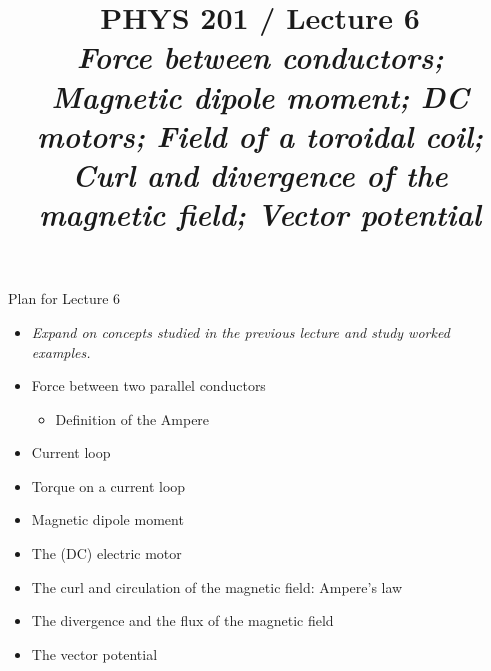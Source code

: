 \renewcommand{\prevlecture}{5 }
\renewcommand{\thislecture}{6 }
\renewcommand{\nextlecture}{7 }

%
%

\title[PHYS 201 / Lecture \thislecture]
{
  PHYS 201 / Lecture \thislecture\\
  {\it Force between conductors; Magnetic dipole moment;
        DC motors; Field of a toroidal coil;
        Curl and divergence of the magnetic field; Vector potential}\\
}



\begin{frame}[plain]
  \titlepage
\end{frame}


%
%

\renewcommand{\lecturesummarytitle}{Revision }


%
%


\begin{frame}{Plan for Lecture \thislecture}

\begin{itemize}
  \item {\it Expand on concepts studied in the previous lecture and study worked examples.}
  \vspace{0.2cm}
  \item Force between two parallel conductors
   \begin{itemize}
       \item Definition of the Ampere
   \end{itemize}
  \item Current loop
  \item Torque on a current loop
  \item Magnetic dipole moment
  \item The (DC) electric motor
  \item The curl and circulation of the magnetic field: Ampere's law
  \item The divergence and the flux of the magnetic field
  \item The vector potential
\end{itemize}


\end{frame}

